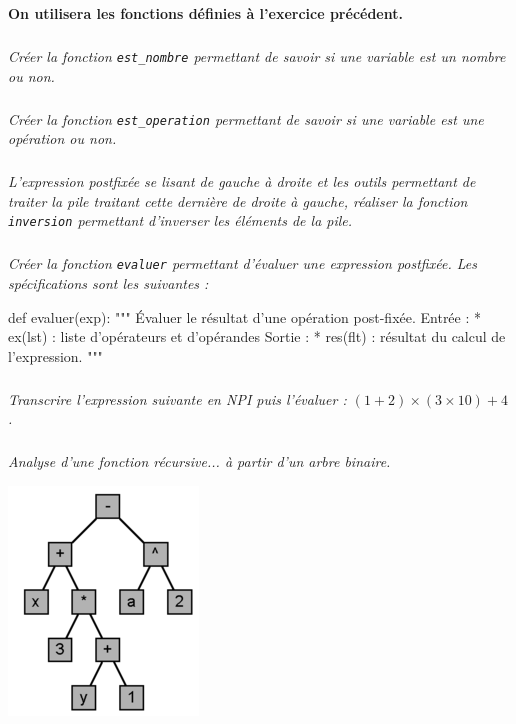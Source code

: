 \documentclass[10pt,fleqn]{article} %
\begin{document}
\begin{multicols}{2}
\textbf{On utilisera les fonctions définies à l'exercice précédent.}
 
\subparagraph{}\textit{Créer la fonction \texttt{est\_nombre} permettant de savoir si une variable est un nombre ou non.}

\subparagraph{}\textit{Créer la fonction \texttt{est\_operation} permettant de savoir si une variable est une opération ou non.}

\subparagraph{}\textit{L'expression postfixée se lisant de gauche à droite et les outils permettant de traiter la pile traitant cette dernière de droite à gauche, réaliser la fonction \texttt{inversion} permettant d'inverser les éléments de la pile.}


\subparagraph{}\textit{Créer la fonction \texttt{evaluer} permettant d'évaluer une expression postfixée. Les spécifications sont les suivantes :}

\begin{py}
\begin{python}
def evaluer(exp):
    """
    Évaluer le résultat d'une opération post-fixée.
    Entrée : 
     * ex(lst) : liste d'opérateurs et d'opérandes
    Sortie : 
     * res(flt) : résultat du calcul de l'expression.
    """
\end{python}
\end{py}

\subparagraph{}
\textit{Transcrire l'expression suivante en NPI puis l'évaluer : $\left( 1+2\right)\times\left(3\times10\right)+4$.}

\subparagraph{}
\textit{Analyse d'une fonction récursive... à partir d'un arbre binaire.}
\begin{center}
\includegraphics[width=.5\linewidth]{images/arbre}
\end{center}
\end{multicols}
\end{document}
